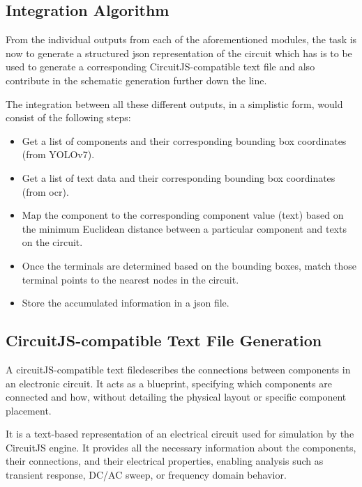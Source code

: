 \subsection{Integration Algorithm}

From the individual outputs from each of the aforementioned modules, the task is now to generate a structured \gls{json} representation of the circuit which has is to be used to generate a corresponding CircuitJS-compatible text file and also contribute in the schematic generation further down the line.

The integration between all these different outputs, in a simplistic form, would consist of the following steps:

\begin{itemize}
    \item Get a list of components and their corresponding bounding box coordinates (from YOLOv7).
    
    \item Get a list of text data and their corresponding bounding box coordinates (from \gls{ocr}).
    
    \item Map the component to the corresponding component value (text) based on the minimum Euclidean distance between a particular component and texts on the circuit.
    
    \item Once the terminals are determined based on the bounding boxes, match those terminal points to the nearest nodes in the circuit.
    
    \item Store the accumulated information in a \gls{json} file.
\end{itemize}

\subsection{CircuitJS-compatible Text File Generation}

A circuitJS-compatible text filedescribes the connections between components in an electronic circuit. It acts as a blueprint, specifying which components are connected and how, without detailing the physical layout or specific component placement.

It is a text-based representation of an electrical circuit used for simulation by the CircuitJS engine. It provides all the necessary information about the components, their connections, and their electrical properties, enabling analysis such as transient response, DC/AC sweep, or frequency domain behavior.

